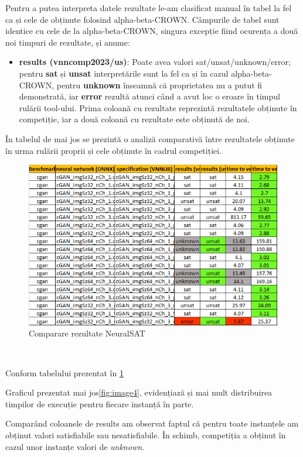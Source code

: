 Pentru a putea interpreta datele rezultate le-am clasificat manual în tabel la fel ca și cele de obținute folosind alpha-beta-CROWN. Câmpurile de tabel sunt identice cu cele de la alpha-beta-CROWN, singura excepție fiind ocurența a două noi timpuri de rezultate, și anume:
\begin{itemize}
    \item \textbf{results (vnncomp2023/us)}: Poate avea valori sat/unsat/unknown/error; pentru \textbf{sat} și \textbf{unsat} interpretările sunt la fel ca și în cazul alpha-beta-CROWN, pentru \textbf{unknown} înseamnă că proprietatea nu a putut fi demonstrată, iar \textbf{error} rezultă atunci când a avut loc o eroare în timpul rulării tool-ului.
    Prima coloană cu rezultate reprezintă rezultatele obținute în competiție, iar a două coloană cu rezultate este obținută de noi.
\end{itemize}

În tabelul de mai jos se prezintă o analiză comparativă între rezultatele obținute în urma rulării proprii și cele obținute în cadrul competiției.

\begin{figure}[h]
\centering 
\includegraphics[width=0.8\linewidth]{imagini/interpretare rezultate/NeuralSAT_comp_vs_us.png}
\caption{Comparare rezultate NeuralSAT}
\label{fig:image2} 
\end{figure}
\

Conform tabelului prezentat în \ref{fig:image2}

Graficul prezentat mai jos\ref{fig:image4}, evidențiază și mai mult distribuirea timpilor de execuție pentru fiecare instanță în parte.

Comparând coloanele de results am observat faptul că pentru toate instanțele am obținut valori satisfiabile sau nesatisfiabile. În schimb, competiția a obținut în cazul unor instanțe valori de \textit{unknown}.

